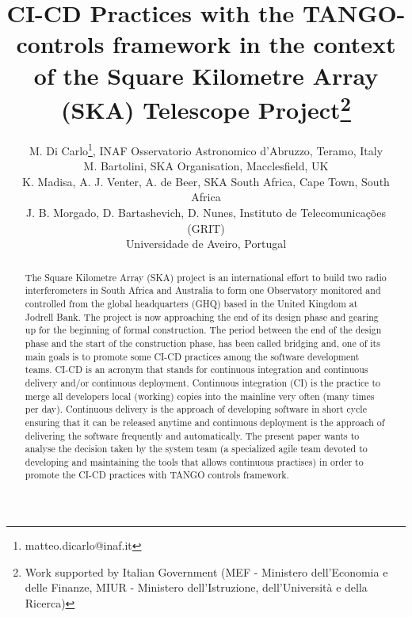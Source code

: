 \documentclass[a4paper,
               keeplastbox,   %
               ]{jacow}
\begin{document}
\title{CI-CD Practices with the TANGO-controls framework in the context of the Square Kilometre Array (SKA) Telescope Project\thanks{Work supported by Italian Government (MEF - Ministero dell'Economia e delle Finanze, MIUR - Ministero dell'Istruzione, dell'Università e della Ricerca)}}

\author{M. Di Carlo\thanks{matteo.dicarlo@inaf.it}, INAF Osservatorio Astronomico d'Abruzzo, Teramo, Italy \\
		M. Bartolini, SKA Organisation, Macclesfield, UK \\
		K. Madisa, A. J. Venter, A. de Beer, SKA South Africa, Cape Town, South Africa \\
		J. B. Morgado, D. Bartashevich, D. Nunes, Instituto de Telecomunicações (GRIT) \\ 
		Universidade de Aveiro, Portugal}
\maketitle

%
\begin{abstract}
  The Square Kilometre Array (SKA) project is an international effort to build two radio interferometers in South Africa and Australia to form one Observatory monitored and controlled from the global headquarters (GHQ) based in the United Kingdom at Jodrell Bank. The project is now approaching the end of its design phase and gearing up for the beginning of formal construction. The period between the end of the design phase and the start of the construction phase, has been called bridging and, one of its main goals is to promote some CI-CD practices among the software development teams. CI-CD is an acronym that stands for continuous integration and continuous delivery and/or continuous deployment. Continuous integration (CI) is the practice to merge all developers local (working) copies into the mainline very often (many times per day). Continuous delivery is the approach of developing software in short cycle ensuring that it can be released anytime and continuous deployment is the approach of delivering the software frequently and automatically. The present paper wants to analyse the decision taken by the system team (a specialized agile team devoted to developing and maintaining the tools that allows continuous practises) in order to promote the CI-CD practices with TANGO controls framework. 

\end{abstract}
\end{document}
